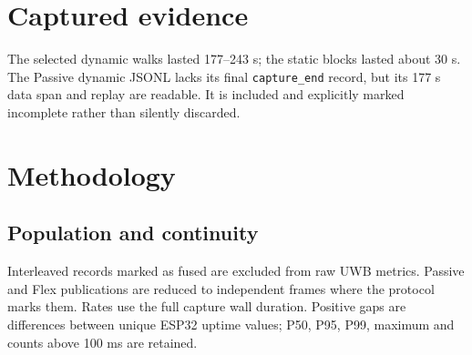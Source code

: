 \documentclass[10pt,a4paper]{article}
\begin{document}
\section{Captured evidence}

The selected dynamic walks lasted 177--243 s; the static blocks lasted about
30 s. The Passive dynamic JSONL lacks its final \texttt{capture\_end} record,
but its 177 s data span and replay are readable. It is included and explicitly
marked incomplete rather than silently discarded.

\begin{center}\scriptsize{}
\end{center}

\section{Methodology}

\subsection{Population and continuity}
Interleaved records marked as fused are excluded from raw UWB metrics. Passive
and Flex publications are reduced to independent frames where the protocol
marks them. Rates use the full capture wall duration. Positive gaps are
differences between unique ESP32 uptime values; P50, P95, P99, maximum and
counts above 100 ms are retained.
\end{document}
